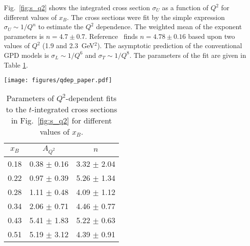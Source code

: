 \documentclass[prc,floatfix,twocolumn,superscriptaddress,letter]{revtex4}
\begin{document}
Fig.~\ref{fig:s_q2} shows the integrated  cross section  $\sigma_U$  as a function of $Q^2$ for  different
values of $x_B$. The  cross sections were fit by the simple expression \mbox{$\sigma_U \sim 1/Q^n$} to estimate the
$Q^2$ dependence.  The weighted mean of the exponent parameters is $n=4.7\pm 0.7
$. Reference~\cite{Hall-A-pi0} finds $n= 4.78\pm0.16$ based upon two values of $Q^2$ (1.9 and 2.3~GeV$^2$).
The asymptotic prediction of the conventional GPD models is  $\sigma_L\sim1/Q^6$ and $\sigma_T\sim1/Q^8$.
The parameters of the fit are given in Table \ref{table-qdep}. 



\begin{figure*}
\begin{center}
\texttt{[image: figures/qdep\_paper.pdf]}
\end{center}
\caption{(color online) 
The   $t$-integrated   ``virtual photon"  cross section $\sigma_T+\epsilon\sigma_L$ as a function of $Q^2$ for the reaction
$\gamma^*p\to p^\prime\pi^0$ for $x_B$=0.18, 0.22, 0.28, 0.34, 0.43 and 0.51. The curves are fits
to a power law $\sigma_U =A_{Q^2}/Q^n$ where $A_{Q^2}$ and $n$ are fit parameters. }
\label{fig:s_q2} 
\end{figure*}

\begingroup
\squeezetable
\begin{table}
\caption{Parameters of $Q^2$-dependent fits to the $t$-integrated cross sections in Fig.~\ref{fig:s_q2} for different values of $x_B$.}
\begin{ruledtabular}
\begin{tabular}{ccc}
 $x_B$ & $A_{Q^2}$ & $n$ \\\hline

 0.18 &  0.38 $\pm$ 0.16 &  3.32 $\pm$ 2.04 \\
 0.22 &  0.97 $\pm$ 0.39 &  5.26 $\pm$ 1.34 \\
 0.28 &  1.11 $\pm$ 0.48 &  4.09 $\pm$ 1.12 \\
 0.34 &  2.06 $\pm$ 0.71 &  4.46 $\pm$ 0.77 \\
 0.43 &  5.41 $\pm$ 1.83 &  5.22 $\pm$ 0.63 \\
 0.51 &  5.19 $\pm$ 3.12 &  4.39 $\pm$ 0.91 \\
\end{tabular}
\end{ruledtabular}
\label{table-qdep}
\end{table}
\endgroup
\end{document}
